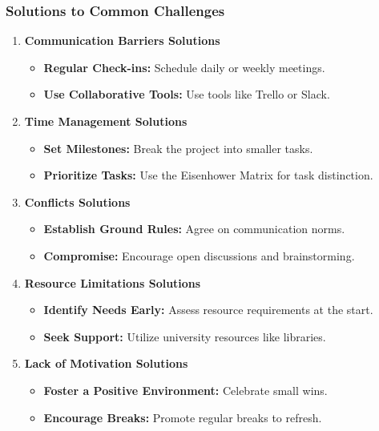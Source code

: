 \documentclass[aspectratio=169]{beamer}
\begin{document}
\begin{frame}[fragile]
    \frametitle{Solutions to Common Challenges}
    \begin{enumerate}
        \item \textbf{Communication Barriers Solutions}
        \begin{itemize}
            \item \textbf{Regular Check-ins:} Schedule daily or weekly meetings.
            \item \textbf{Use Collaborative Tools:} Use tools like Trello or Slack.
        \end{itemize}

        \item \textbf{Time Management Solutions}
        \begin{itemize}
            \item \textbf{Set Milestones:} Break the project into smaller tasks.
            \item \textbf{Prioritize Tasks:} Use the Eisenhower Matrix for task distinction.
        \end{itemize}

        \item \textbf{Conflicts Solutions}
        \begin{itemize}
            \item \textbf{Establish Ground Rules:} Agree on communication norms.
            \item \textbf{Compromise:} Encourage open discussions and brainstorming.
        \end{itemize}

        \item \textbf{Resource Limitations Solutions}
        \begin{itemize}
            \item \textbf{Identify Needs Early:} Assess resource requirements at the start.
            \item \textbf{Seek Support:} Utilize university resources like libraries.
        \end{itemize}

        \item \textbf{Lack of Motivation Solutions}
        \begin{itemize}
            \item \textbf{Foster a Positive Environment:} Celebrate small wins.
            \item \textbf{Encourage Breaks:} Promote regular breaks to refresh.
        \end{itemize}
    \end{enumerate}
\end{frame}
\end{document}
